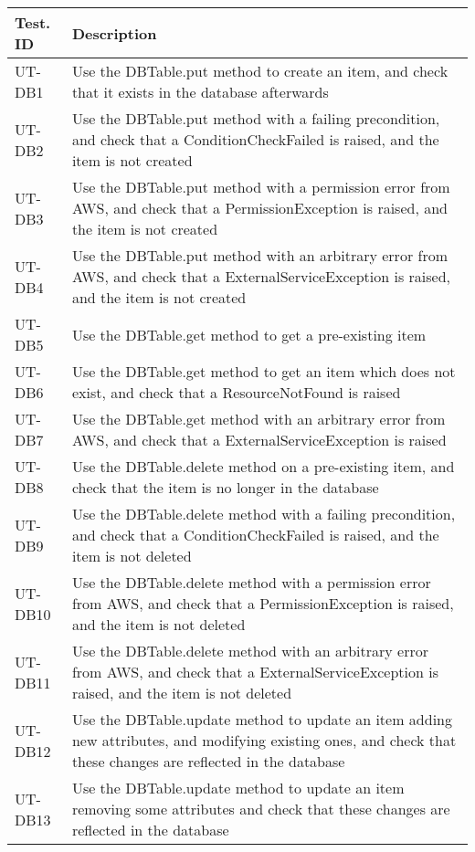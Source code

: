\documentclass[12pt, titlepage]{article}
\begin{document}
\begin{longtable}{|m{2cm}|m{10cm}|}
  \hline
  \textbf{Test. ID} & \textbf{Description} \\ \hline
  UT-DB1 & Use the DBTable.put method to create an item, and check
  that it exists in the database afterwards\\ \hline
  UT-DB2 & Use the DBTable.put method with a failing precondition,
  and check that a ConditionCheckFailed is raised, and the item is
  not created\\ \hline
  UT-DB3 & Use the DBTable.put method with a permission error from
  AWS, and check that a PermissionException is raised, and the item
  is not created\\ \hline
  UT-DB4 & Use the DBTable.put method with an arbitrary error from
  AWS, and check that a ExternalServiceException is raised, and the
  item is not created\\ \hline
  UT-DB5 & Use the DBTable.get method to get a pre-existing item\\ \hline
  UT-DB6 & Use the DBTable.get method to get an item which does not
  exist, and check that a ResourceNotFound is raised\\ \hline
  UT-DB7 & Use the DBTable.get method with an arbitrary error from
  AWS, and check that a ExternalServiceException is raised\\ \hline
  UT-DB8 & Use the DBTable.delete method on a pre-existing item, and
  check that the item is no longer in the database\\ \hline
  UT-DB9 & Use the DBTable.delete method with a failing
  precondition, and check that a ConditionCheckFailed is raised, and
  the item is not deleted\\ \hline
  UT-DB10 & Use the DBTable.delete method with a permission error
  from AWS, and check that a PermissionException is raised, and the
  item is not deleted\\ \hline
  UT-DB11 & Use the DBTable.delete method with an arbitrary error
  from AWS, and check that a ExternalServiceException is raised, and
  the item is not deleted\\ \hline
  UT-DB12 & Use the DBTable.update method to update an item adding
  new attributes, and modifying existing ones, and check that these
  changes are reflected in the database\\ \hline
  UT-DB13 & Use the DBTable.update method to update an item removing
  some attributes and check that these changes are reflected in the
  database\\ \hline

\end{longtable}
\end{document}
